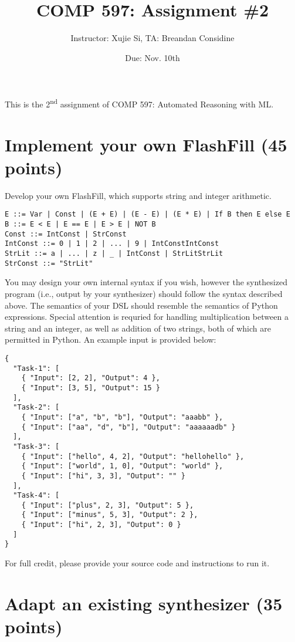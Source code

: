 \documentclass[11pt]{article}
\author{Instructor: Xujie Si, TA: Breandan Considine}
\date{Due: Nov. 10th}
\title{COMP 597: Assignment \#2}
\begin{document}
    \maketitle
    \noindent This is the 2\textsuperscript{nd} assignment of COMP 597: Automated Reasoning with ML.

    \section{Implement your own FlashFill (45 points)}

    Develop your own FlashFill, which supports string and integer arithmetic.

    \begin{lstlisting}[basicstyle=\ttfamily\footnotesize]
E ::= Var | Const | (E + E) | (E - E) | (E * E) | If B then E else E
B ::= E < E | E == E | E > E | NOT B
Const ::= IntConst | StrConst
IntConst ::= 0 | 1 | 2 | ... | 9 | IntConstIntConst
StrLit ::= a | ... | z | _ | IntConst | StrLitStrLit
StrConst ::= "StrLit"
    \end{lstlisting}

    \noindent You may design your own internal syntax if you wish, however the synthesized program (i.e., output by your synthesizer) should follow the syntax described above. The semantics of your DSL should resemble the semantics of Python expressions. Special attention is requried for handling multiplication between a string and an integer, as well as addition of two strings, both of which are permitted in Python. An example input is provided below:

    \begin{lstlisting}[basicstyle=\ttfamily\tiny]
{
  "Task-1": [
    { "Input": [2, 2], "Output": 4 },
    { "Input": [3, 5], "Output": 15 }
  ],
  "Task-2": [
    { "Input": ["a", "b", "b"], "Output": "aaabb" },
    { "Input": ["aa", "d", "b"], "Output": "aaaaaadb" }
  ],
  "Task-3": [
    { "Input": ["hello", 4, 2], "Output": "hellohello" },
    { "Input": ["world", 1, 0], "Output": "world" },
    { "Input": ["hi", 3, 3], "Output": "" }
  ],
  "Task-4": [
    { "Input": ["plus", 2, 3], "Output": 5 },
    { "Input": ["minus", 5, 3], "Output": 2 },
    { "Input": ["hi", 2, 3], "Output": 0 }
  ]
}
    \end{lstlisting}

    \noindent For full credit, please provide your source code and instructions to run it.

    \section{Adapt an existing synthesizer (35 points)}
\end{document}
